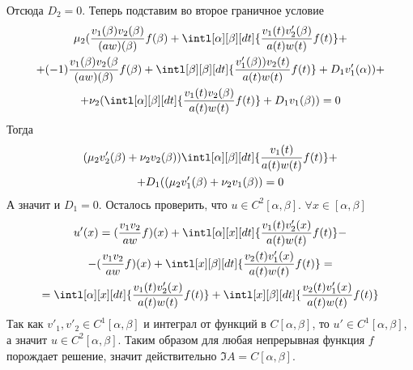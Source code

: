 \documentclass[14pt]{extarticle}
\begin{document}
Отсюда $D_2 = 0$.
Теперь подставим во второе граничное условие
\begin{multline*}
    \mu_2(\dfrac{v_1(\beta) v_2(\beta)}{(aw)(\beta)}f(\beta) +
    \intl[\alpha][\beta][dt]{\dfrac{v_1(t) v'_2(\beta)}{a(t) w(t)} f(t)} +\\+
    (-1)\dfrac{v_1(\beta) v_2(\beta}{(aw)(\beta)}f(\beta) +
    \intl[\beta][\beta][dt]{\dfrac{v'_1(\beta)) v_2(t)}{a(t) w(t)} f(t)}+
    D_1 v'_1(\alpha)) +\\+
    \nu_2(\intl[\alpha][\beta][dt]{\dfrac{v_1(t) v_2(\beta)}{a(t) w(t)} f(t)} +
    D_1 v_1(\beta)) = 0
\end{multline*}
Тогда
\begin{multline*}
    (\mu_2 v'_2(\beta) + \nu_2 v_2(\beta))
    \intl[\alpha][\beta][dt]{\dfrac{v_1(t)}{a(t) w(t)} f(t)} +\\+
    D_1((\mu_2 v'_1(\beta) + \nu_2 v_1(\beta))
    = 0
\end{multline*}
А значит и $D_1 = 0$.
Осталось проверить, что $u \in C^2[\alpha, \beta]$.
$\forall x \in [\alpha, \beta]$
\begin{multline*}
u'(x) = (\dfrac{v_1 v_2}{aw}f)(x) + 
\intl[\alpha][x][dt]{\dfrac{v_1(t)v'_2(x)}{a(t) w(t)} f(t)} -\\-
(\dfrac{v_1 v_2}{aw}f)(x) + \intl[x][\beta][dt]{\dfrac{v_2(t)v'_1(x)}{a(t) w(t)} f(t)}
=\\=
\intl[\alpha][x][dt]{\dfrac{v_1(t)v'_2(x)}{a(t) w(t)} f(t)} +
\intl[x][\beta][dt]{\dfrac{v_2(t)v'_1(x)}{a(t) w(t)} f(t)}
\end{multline*}
Так как $v'_1, v'_2 \in C^1[\alpha, \beta]$ и интеграл от функций в $C[\alpha, \beta]$, то
$u' \in C^1[\alpha, \beta]$, а значит $u \in C^2[\alpha, \beta]$.
Таким образом для любая непрерывная функция $f$ порождает решение, значит
действительно $\Im A = C[\alpha, \beta]$.
\end{document}
